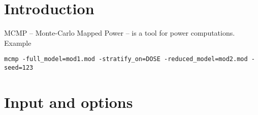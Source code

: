 



\maketitle


\section{Introduction}
MCMP – Monte-Carlo Mapped Power \cite{Vong}  – is a tool for power computations.
Example\\
\begin{verbatim}
mcmp -full_model=mod1.mod -stratify_on=DOSE -reduced_model=mod2.mod -seed=123
\end{verbatim}

\section{Input and options}

